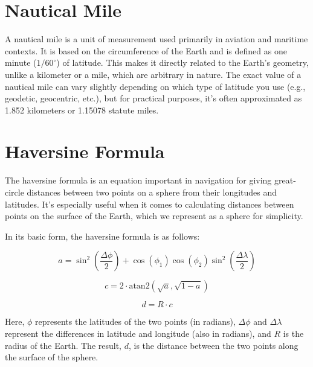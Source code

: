 \section{Nautical Mile}

A nautical mile is a unit of measurement used primarily in aviation
and maritime contexts. It is based on the circumference of the Earth
and is defined as one minute ($1/60^{\circ}$) of latitude. This makes
it directly related to the Earth's geometry, unlike a kilometer or a
mile, which are arbitrary in nature. The exact value of a nautical
mile can vary slightly depending on which type of latitude you use
(e.g., geodetic, geocentric, etc.), but for practical purposes, it's
often approximated as 1.852 kilometers or 1.15078 statute miles.

\section{Haversine Formula}

The haversine formula is an equation important in navigation for
giving great-circle distances between two points on a sphere from
their longitudes and latitudes. It's especially useful when it comes
to calculating distances between points on the surface of the Earth,
which we represent as a sphere for simplicity.

In its basic form, the haversine formula is as follows:

\[
a = \sin^2\left(\frac{\Delta\phi}{2}\right) + \cos(\phi_1)\cos(\phi_2)\sin^2\left(\frac{\Delta\lambda}{2}\right)
\]

\[
c = 2 \cdot \text{atan2} \left( \sqrt{a}, \sqrt{1-a} \right)
\]

\[
d = R \cdot c
\]

Here, $\phi$ represents the latitudes of the two points (in radians),
$\Delta\phi$ and $\Delta\lambda$ represent the differences in latitude
and longitude (also in radians), and $R$ is the radius of the
Earth. The result, $d$, is the distance between the two points along
the surface of the sphere.
